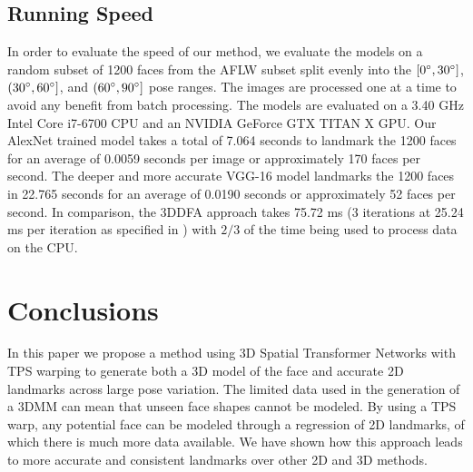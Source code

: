 \documentclass[10pt,twocolumn,letterpaper]{article}
\begin{document}

\subsection{Running Speed}
In order to evaluate the speed of our method, we evaluate the models on a random subset of 1200 faces from the AFLW subset split evenly into the $[0\degree, 30\degree]$, $(30\degree, 60\degree]$, and $(60\degree, 90\degree]$ pose ranges. The images are processed one at a time to avoid any benefit from batch processing. The models are evaluated on a 3.40 GHz Intel Core i7-6700 CPU and an NVIDIA GeForce GTX TITAN X GPU. Our AlexNet trained model takes a total of 7.064 seconds to landmark the 1200 faces for an average of 0.0059 seconds per image or approximately 170 faces per second. The deeper and more accurate VGG-16 model landmarks the 1200 faces in 22.765 seconds for an average of 0.0190 seconds or approximately 52 faces per second. In comparison, the 3DDFA approach \cite{Zhu16falp} takes 75.72 ms (3 iterations at 25.24 ms per iteration as specified in \cite{Zhu16falp}) with $2/3$ of the time being used to process data on the CPU. 

\section{Conclusions}
In this paper we propose a method using 3D Spatial Transformer Networks with TPS warping to generate both a 3D model of the face and accurate 2D landmarks across large pose variation. The limited data used in the generation of a 3DMM can mean that unseen face shapes cannot be modeled. By using a TPS warp, any potential face can be modeled through a regression of 2D landmarks, of which there is much more data available. We have shown how this approach leads to more accurate and consistent landmarks over other 2D and 3D methods.

{\small


}
\end{document}
